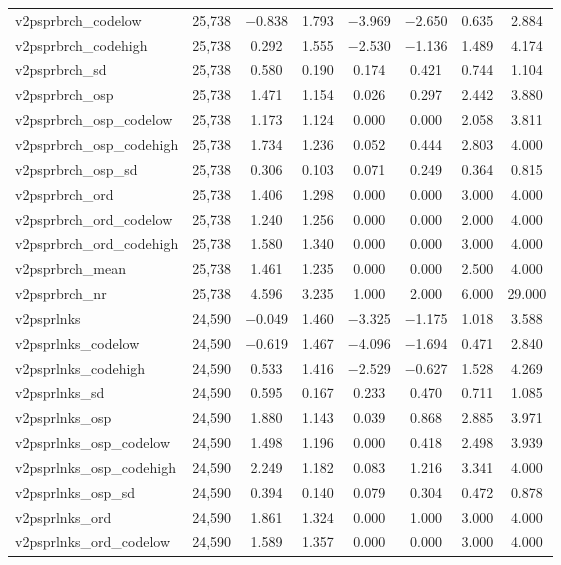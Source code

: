 \begin{table}[!htbp]
\begin{tabular}{@{\extracolsep{5pt}}lccccccc}
v2psprbrch\_codelow & 25,738 & $-$0.838 & 1.793 & $-$3.969 & $-$2.650 & 0.635 & 2.884 \\ 
v2psprbrch\_codehigh & 25,738 & 0.292 & 1.555 & $-$2.530 & $-$1.136 & 1.489 & 4.174 \\ 
v2psprbrch\_sd & 25,738 & 0.580 & 0.190 & 0.174 & 0.421 & 0.744 & 1.104 \\ 
v2psprbrch\_osp & 25,738 & 1.471 & 1.154 & 0.026 & 0.297 & 2.442 & 3.880 \\ 
v2psprbrch\_osp\_codelow & 25,738 & 1.173 & 1.124 & 0.000 & 0.000 & 2.058 & 3.811 \\ 
v2psprbrch\_osp\_codehigh & 25,738 & 1.734 & 1.236 & 0.052 & 0.444 & 2.803 & 4.000 \\ 
v2psprbrch\_osp\_sd & 25,738 & 0.306 & 0.103 & 0.071 & 0.249 & 0.364 & 0.815 \\ 
v2psprbrch\_ord & 25,738 & 1.406 & 1.298 & 0.000 & 0.000 & 3.000 & 4.000 \\ 
v2psprbrch\_ord\_codelow & 25,738 & 1.240 & 1.256 & 0.000 & 0.000 & 2.000 & 4.000 \\ 
v2psprbrch\_ord\_codehigh & 25,738 & 1.580 & 1.340 & 0.000 & 0.000 & 3.000 & 4.000 \\ 
v2psprbrch\_mean & 25,738 & 1.461 & 1.235 & 0.000 & 0.000 & 2.500 & 4.000 \\ 
v2psprbrch\_nr & 25,738 & 4.596 & 3.235 & 1.000 & 2.000 & 6.000 & 29.000 \\ 
v2psprlnks & 24,590 & $-$0.049 & 1.460 & $-$3.325 & $-$1.175 & 1.018 & 3.588 \\ 
v2psprlnks\_codelow & 24,590 & $-$0.619 & 1.467 & $-$4.096 & $-$1.694 & 0.471 & 2.840 \\ 
v2psprlnks\_codehigh & 24,590 & 0.533 & 1.416 & $-$2.529 & $-$0.627 & 1.528 & 4.269 \\ 
v2psprlnks\_sd & 24,590 & 0.595 & 0.167 & 0.233 & 0.470 & 0.711 & 1.085 \\ 
v2psprlnks\_osp & 24,590 & 1.880 & 1.143 & 0.039 & 0.868 & 2.885 & 3.971 \\ 
v2psprlnks\_osp\_codelow & 24,590 & 1.498 & 1.196 & 0.000 & 0.418 & 2.498 & 3.939 \\ 
v2psprlnks\_osp\_codehigh & 24,590 & 2.249 & 1.182 & 0.083 & 1.216 & 3.341 & 4.000 \\ 
v2psprlnks\_osp\_sd & 24,590 & 0.394 & 0.140 & 0.079 & 0.304 & 0.472 & 0.878 \\ 
v2psprlnks\_ord & 24,590 & 1.861 & 1.324 & 0.000 & 1.000 & 3.000 & 4.000 \\ 
v2psprlnks\_ord\_codelow & 24,590 & 1.589 & 1.357 & 0.000 & 0.000 & 3.000 & 4.000 \\ 

\end{tabular}
\end{table}
